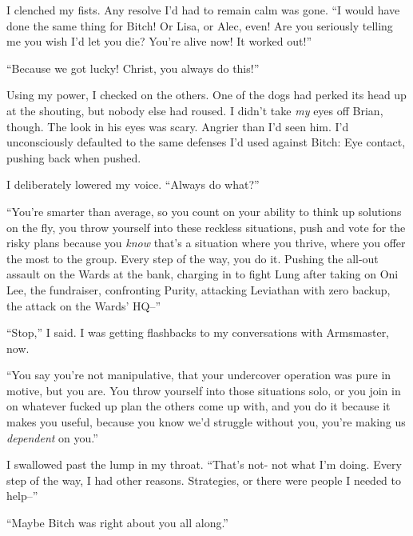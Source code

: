 I clenched my fists.  Any resolve I'd had to remain calm was gone.  ``I would have done the same thing for Bitch!  Or Lisa, or Alec, even!  Are you seriously telling me you wish I'd let you die?  You're alive now!  It worked out!''



``Because we got lucky!  Christ, you always do this!''



Using my power, I checked on the others.  One of the dogs had perked its head up at the shouting, but nobody else had roused.  I didn't take \emph{my} eyes off Brian, though.  The look in his eyes was scary.  Angrier than I'd seen him.  I'd unconsciously defaulted to the same defenses I'd used against Bitch: Eye contact, pushing back when pushed.



I deliberately lowered my voice.  ``Always do what?''



``You're smarter than average, so you count on your ability to think up solutions on the fly, you throw yourself into these reckless situations, push and vote for the risky plans because you \emph{know} that's a situation where you thrive, where you offer the most to the group.  Every step of the way, you do it.  Pushing the all-out assault on the Wards at the bank, charging in to fight Lung after taking on Oni Lee, the fundraiser, confronting Purity, attacking Leviathan with zero backup, the attack on the Wards' HQ--''



``Stop,'' I said.  I was getting flashbacks to my conversations with Armsmaster, now.



``You say you're not manipulative, that your undercover operation was pure in motive, but you are.  You throw yourself into those situations solo, or you join in on whatever fucked up plan the others come up with, and you do it because it makes you useful, because you know we'd struggle without you, you're making us \emph{dependent} on you.''



I swallowed past the lump in my throat.  ``That's not- not what I'm doing.  Every step of the way, I had other reasons.  Strategies, or there were people I needed to help--''



``Maybe Bitch was right about you all along.''



